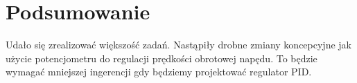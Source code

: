 \documentclass[10pt, a4paper]{article}
\begin{document}
\section{Podsumowanie}

Udało się zrealizować większość zadań. Nastąpiły drobne zmiany koncepcyjne jak użycie potencjometru do regulacji prędkości obrotowej napędu. To będzie wymagać mniejszej ingerencji gdy będziemy projektować regulator PID.

\newpage
{}


\end{document}
